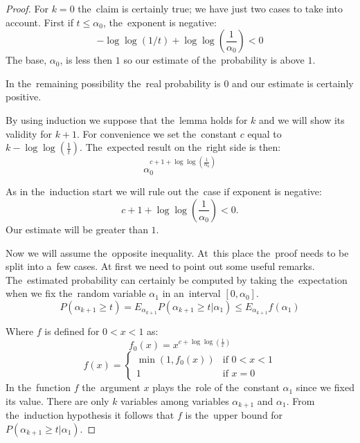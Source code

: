 \begin{proof}
For $k = 0$ the~claim is certainly true; we have just two cases to take into account. First if $t \leq \alpha_0$, the~exponent is negative:
\begin{displaymath}
-\log \log (1/t) + \log \log \left(\frac{1}{\alpha_0}\right) < 0
\end{displaymath}
The base, $\alpha_0$, is less then $1$ so our estimate of the~probability is above $1$. 

In the~remaining possibility the~real probability is $0$ and our estimate is certainly positive.

By using induction we suppose that the~lemma holds for $k$ and we will show its validity for $k + 1$. For convenience we set the~constant $c$ equal to $k - \log \log \left(\frac{1}{t}\right)$. The~expected result on the~right side is then:
\begin{displaymath}
\alpha_0^{c + 1 + \log \log \left(\frac{1}{\alpha_0}\right)}
\end{displaymath}

As in the~induction start we will rule out the~case if exponent is negative:
\begin{displaymath}
c + 1 + \log \log \left(\frac{1}{\alpha_0}\right) < 0\textit{.}
\end{displaymath}
Our estimate will be greater than $1$. 

Now we will assume the~opposite inequality. At~this place the~proof needs to be split into a~few cases. At first we need to point out some useful remarks. The~estimated probability can certainly be computed by taking the~expectation when we fix the~random variable $\alpha_1$ in an~interval $[0, \alpha_0]$.
\begin{displaymath}
P(\alpha_{k+1} \geq t) = E_{\alpha_{k+1}} P(\alpha_{k+1} \geq t | \alpha_1) \leq E_{\alpha_{k+1}} f(\alpha_1)
\end{displaymath}

Where $f$ is defined for $0 < x < 1$ as:
\begin{displaymath}
f_0(x) = x ^ {c + \log \log \left(\frac{1}{x}\right)}
\end{displaymath}
\begin{equation}\label{f-definition}
 f(x) = 
  \begin{cases} 
   \min(1, f_0(x)) & \text{if } 0 < x < 1 \\
   1 & \text{if } x = 0
  \end{cases}
\end{equation}
In the~function $f$ the~argument $x$ plays the~role of the~constant $\alpha_1$ since we fixed its value. There are only $k$ variables among variables $\alpha_{k+1}$ and $\alpha_1$. From the~induction hypothesis it follows that $f$ is the~upper bound for $P(\alpha_{k+1} \geq t | \alpha_1)$.


\end{proof}
